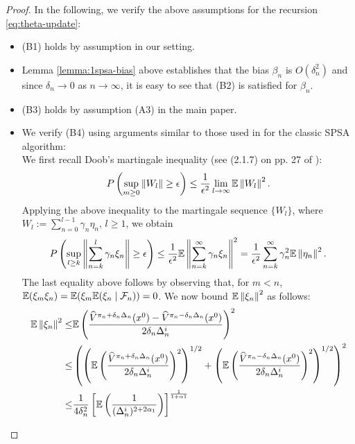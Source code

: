 \begin{proof}
In the following, we verify the above assumptions for the recursion \eqref{eq:theta-update}:
\begin{itemize}
\item (B1) holds by assumption in our setting.

\item Lemma \ref{lemma:1spsa-bias} above establishes that the bias $\beta_n$ is $O(\delta_n^2)$ and since $\delta_n \rightarrow 0$ as $n\rightarrow \infty$, it is easy to see that (B2) is satisfied for $\beta_n$. 

\item (B3) holds by assumption (A3) in the main paper.

\item We verify (B4) using arguments similar to those used in \cite{spall} for the classic SPSA algorithm:\\
We first recall Doob's martingale inequality (see (2.1.7) on pp. 27 of \cite{kushner-clark}):
\begin{align}
P\left( \sup_{m\geq 0}   \left\|W_l\right\| \geq \epsilon \right) \le \dfrac{1}{\epsilon^2} \lim_{l\rightarrow \infty} \mathbb{E} \left\|W_l\right\|^2. 
\end{align}
Applying the above inequality to the martingale sequence $\{W_l\}$, where  $W_l := \sum_{n=0}^{l-1} \gamma_n \eta_n$, $l\ge 1$, we obtain
\begin{align}
P\left( \sup_{l\geq k}   \left\|\sum_{n=k}^{l} \gamma_n \xi_n\right\| \geq \epsilon \right) \le \dfrac{1}{\epsilon^2} \mathbb{E} \left\|
\sum_{n=k}^{\infty} \gamma_n \xi_n\right\|^2 = \dfrac{1}{\epsilon^2} \sum_{n=k}^{\infty} \gamma_n^2 \mathbb{E}\left\| \eta_n\right\|^2. \label{eq:b4}
\end{align}
The last equality above follows by observing that, for $m < n$, $\mathbb{E}(\xi_m \xi_n) = \mathbb{E}(\xi_m \mathbb{E}(\xi_n\mid \mathcal{F}_n))=0$.
We now bound $\mathbb{E}\left\| \xi_n\right\|^2$ as follows:
\begin{align}
\E\left\| \xi_n\right\|^2\le &\E\left(\dfrac{\widehat V^{\pi_n + \delta_n \Delta_n}(x^0) -\widehat V^{\pi_n - \delta_n \Delta_n}(x^0)}{2 \delta_n \Delta_n^i}\right)^2 \label{eq:mi}\\
\le &\left(\left(\E\left(\dfrac{\widehat V^{\pi_n + \delta_n \Delta_n}(x^0)}{2 \delta_n \Delta_n^i}\right)^2\right)^{1/2}
+ \left(\E\left(\dfrac{\widehat V^{\pi_n - \delta_n \Delta_n}(x^0)}{2 \delta_n \Delta_n^i}\right)^2\right)^{1/2}\right)^2 \label{eq:minko}\\
\le &\frac1{4\delta_n^2} \left[ \E\left(\frac1{(\Delta_n^i)^{2+2\alpha_1}}\right) \right]^{\frac{1}{1+\alpha1}} \nonumber\\

\end{align}
\end{itemize}
\end{proof}
